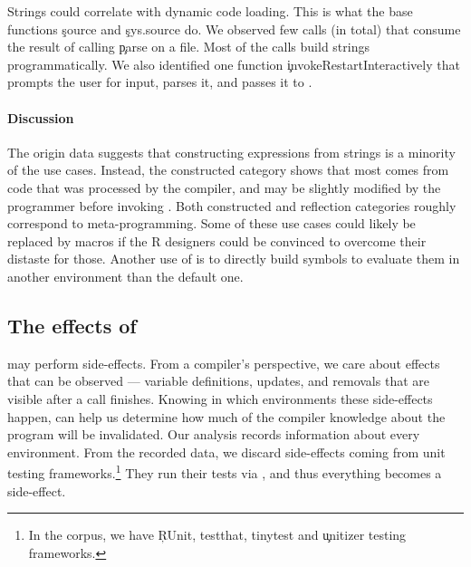\documentclass[screen,acmsmall]{acmart}
\begin{document}
Strings could correlate with dynamic code loading. This is what the base
functions \c{source} and \c{sys.source} do. We observed few calls
(\packageNbParseFromFileSites in total) that consume the result of calling
\c{parse} on a file. Most of the calls build strings programmatically. We also
identified one function \c{invokeRestartInteractively} that prompts the user for
input, parses it, and passes it to \eval. 

\paragraph{Discussion}
The origin data suggests that constructing expressions from strings is a
minority of the use cases. Instead, the constructed category shows that most
\evals comes from code that was processed by the compiler, and may be slightly
modified by the programmer before invoking \eval. Both constructed and
reflection categories roughly correspond to meta-programming. Some of these use
cases could likely be replaced by macros if the R designers could be convinced
to overcome their distaste for those. Another use of \eval is to directly build symbols to evaluate them in another environment than the default one.

\subsection{The effects of \eval}

\Eval may perform side-effects. From a compiler's perspective, we care about
effects that can be observed --- \ie variable definitions, updates, and removals
that are visible after a call finishes. Knowing in which environments these
side-effects happen, can help us determine how much of the compiler knowledge
about the program will be invalidated. Our analysis records information about
every environment. From the recorded data, we discard side-effects coming from
unit testing frameworks.\footnote{In the corpus, we have \c{RUnit, testthat,
  tinytest} and \c{unitizer} testing frameworks.} They run their tests via
\eval, and thus everything becomes a side-effect.
\end{document}
